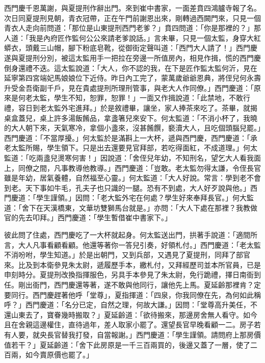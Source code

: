 西門慶千恩萬謝，與夏提刑作辭出門。來到崔中書家，一面差賁四鴻臚寺報了名。次日同夏提刑見朝，青衣冠帶，正在午門前謝恩出來，剛轉過西闕門來，只見一個青衣人走向前問道：「那位是山東提刑西門老爹？」賁四問道：「你是那裡的？」那人道：「我是內府匠作監何公公來請老爹說話。」言未畢，只見一個太監，身穿大紅蟒衣，頭戴三山帽，腳下粉底皂靴，從御街定聲叫道：「西門大人請了！」西門慶遂與夏提刑分別，被這太監用手一把拉在旁邊一所值房內，相見作揖，慌的西門慶倒身還禮不迭。這太監說道：「大人，你不認的我，在下是匠作監太監何沂，見在延寧第四宮端妃馬娘娘位下近侍。昨日內工完了，蒙萬歲爺爺恩典，將侄兒何永壽升受金吾衛副千戶，見在貴處提刑所理刑管事，與老大人作同僚。」西門慶道：「原來是何老太監，學生不知，恕罪，恕罪！」一面又作揖說道：「此禁地，不敢行禮，容日到老太監外宅進拜。」於是敘禮畢，讓坐，家人捧茶來吃了。茶畢，就揭桌盒蓋兒，桌上許多湯飯餚品，拿盞箸兒來安下。何太監道：「不消小杯了，我曉的大人朝下來，天氣寒冷，拿個小盞來，沒甚餚饌，褻瀆大人，且吃個頭腦兒罷。」西門慶道：「不當厚擾。」何太監於是滿斟上一大杯，遞與西門慶，西門慶道：「承老太監所賜，學生領下。只是出去還要見官拜部，若吃得面紅，不成道理。」何太監道：「吃兩盞兒燙寒何害！」因說道：「舍侄兒年幼，不知刑名，望乞大人看我面上，同僚之間，凡事教導他教導。」西門慶道：「豈敢。老太監勿得太謙，令侄長官雖是年幼，居氣養體，自然福至心靈。」何太監道：「大人好說。常言：學到老不會到老。天下事如牛毛，孔夫子也只識的一腿。恐有不到處，大人好歹說與他。」西門慶道：「學生謹領。」因問：「老大監外宅在何處？學生好來奉拜長官。」何大監道：「舍下在天漢橋東，文華坊雙獅馬台就是。」亦問：「大人下處在那裡？我教做官的先去叩拜。」西門慶道：「學生暫借崔中書家下。」

彼此問了住處，西門慶吃了一大杯就起身。何太監送出門，拱著手說道：「適間所言，大人凡事看顧看顧。他還等著你一答兒引奏，好領札付。」西門慶道：「老太監不消吩咐，學生知道。」於是出朝門，又到兵部，又遇見了夏提刑，同拜了部官來。比及到本衛參見朱太尉，遞履歷手本，繳札付，又拜經歷司並本所官員，已是申刻時分。夏提刑改換指揮服色，另具手本參見了朱太尉，免行跪禮，擇日南衙到任。剛出衙門，西門慶還等著，遂不敢與他同行，讓他先上馬。夏延齡那裡肯？定要同行。西門慶趕著他呼「堂尊」，夏指揮道：「四泉，你我同僚在先，為何如此稱呼？」西門慶道：「名分已定，自然之理，何故大謙。」因問：「堂尊高升美任，不還山東去了，寶眷幾時搬取？」夏延齡道：「欲待搬來，那邊房舍無人看守。如今且在舍親這邊權住，直待過年，差人取家小罷了。還望長官早晚看顧一二。房子若有人要，就央長官替我打發，自當報謝。」西門慶道：「學生謹領。請問府上那房價值若干？」夏延齡道：「舍下此房原是一千三百兩買的，後邊又蓋了一層，使了二百兩，如今賣原價也罷了。」

